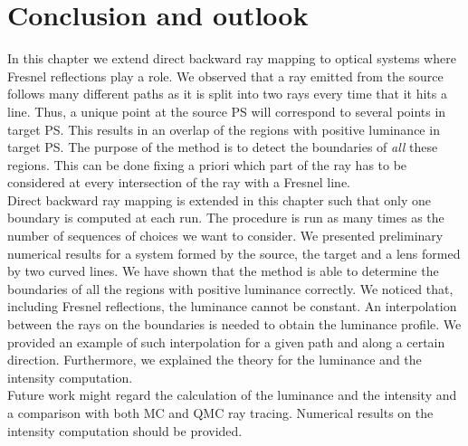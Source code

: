 \section{Conclusion and outlook}
In this chapter we extend direct backward ray mapping to optical systems where Fresnel reflections play a role. We observed that a ray emitted from the source follows many different paths as it is split into two rays every time that it hits a line. Thus, a unique point at the source PS will correspond to several points in target PS. This results in an overlap of the regions with positive luminance in target PS. The purpose of the method is to detect the boundaries of \textit{all} these regions. This can be done fixing a priori which part of the ray has to be considered at every intersection of the ray with a Fresnel line. \\\indent Direct backward ray mapping is extended in this chapter such that only one boundary is computed at each run. The procedure is run as many times as the number of sequences of choices we want to consider. We presented preliminary numerical results for a system formed by the source, the target and a lens formed by two curved lines. We have shown that the method is able to determine the boundaries of all the regions with positive luminance correctly. We noticed that, including Fresnel reflections, the luminance cannot be constant. An interpolation between the rays on the boundaries is needed to obtain the luminance profile. We provided an example of such interpolation for a given path and along a certain direction. Furthermore, we explained the theory for the luminance and the intensity computation. \\ \indent
Future work might regard the calculation of the luminance and the intensity and a comparison with both MC and QMC ray tracing. Numerical results on the intensity computation should be provided.






